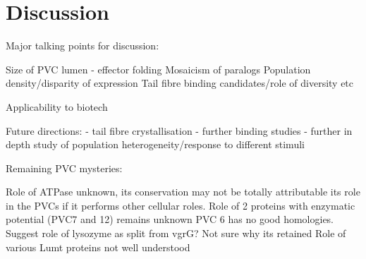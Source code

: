 \pagestyle{IHA-fancy-style}


\chapter{Discussion}\label{Discussion}

Major talking points for discussion:

Size of PVC lumen - effector folding
Mosaicism of paralogs
Population density/disparity of expression
Tail fibre binding candidates/role of diversity etc

Applicability to biotech


Future directions:
	- tail fibre crystallisation
	- further binding studies
	- further in depth study of population heterogeneity/response to different stimuli
	

Remaining PVC mysteries:

Role of ATPase unknown, its conservation may not be totally attributable its role in the PVCs if it performs other cellular roles.
Role of 2 proteins with enzymatic potential (PVC7 and 12) remains unknown
PVC 6 has no good homologies.
Suggest role of lysozyme as split from vgrG? Not sure why its retained
Role of various Lumt proteins not well understood